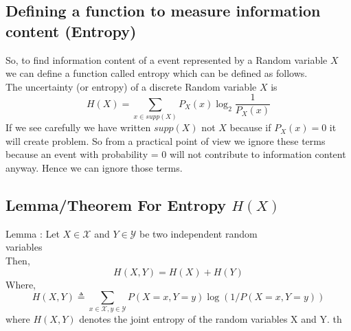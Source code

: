 \documentclass{article}
\begin{document}
\subsection{Defining a function to measure information content (Entropy)}
So, to find information content of a event represented by a Random variable $X$ we can define a function called entropy which can be defined as follows.\\

The uncertainty (or entropy) of a discrete Random variable $X$ is\\
\begin{equation}
 H(X) = \sum_{x \in supp(X)}P_{X}(x)\log_{2}\frac{1}{P_{X}(x)}
\end{equation}
If we see carefully we have written $supp(X)$ not $X$ because if $P_{X}(x) = 0 $ it will create problem. So from a practical point of view we ignore these terms because an event with probability = 0 will not contribute to information content anyway. Hence we can ignore those terms.
\newpage
\subsection{Lemma/Theorem For Entropy $H(X)$}
Lemma : Let $X \in \mathcal{X}$ and $Y \in \mathcal{Y}$ be two independent random \\variables\\
Then,\\ 
\begin{equation}
    H(X,Y) = H(X) + H(Y) 
\end{equation}
Where,\\
\begin{equation}
    H(X,Y) \triangleq \sum_{x \in \mathcal{X} , y \in \mathcal{Y}} P(X = x , Y = y )\log(1/ P(X = x , Y = y ))
\end{equation}
where $H(X,Y)$ denotes the joint entropy of the random variables X and Y.
th
\end{document}
